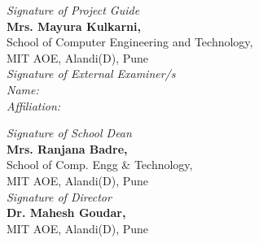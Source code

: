 \begin{minipage}{0.65\textwidth}
\begin{flushleft}
\textit{Signature of Project Guide} \\ [-1mm]
\textbf{Mrs. Mayura Kulkarni,}\\[-1mm]
{School of Computer Engineering and Technology,}\\[-1mm]
{MIT AOE, Alandi(D), Pune}\\[20mm]


\textit{Signature of External Examiner/s} \\ [1mm]
\textit{Name:} \\[-1mm]
\textit{Affiliation:} 
\end{flushleft}
\end{minipage}
\hfill
\begin{minipage}{0.65\textwidth}
\begin{flushleft}
\textit{Signature of School Dean} \\ [-1mm]
\textbf{Mrs. Ranjana Badre,}\\[-1mm]
{School of Comp. Engg \& Technology,}\\[-1mm]
{MIT AOE, Alandi(D), Pune}\\[20mm]
\textit{Signature of Director} \\ [-1mm]
\textbf{Dr. Mahesh Goudar,}\\[-1mm]
{MIT AOE, Alandi(D), Pune}\\[10mm]
\end{flushleft}
\end{minipage}

